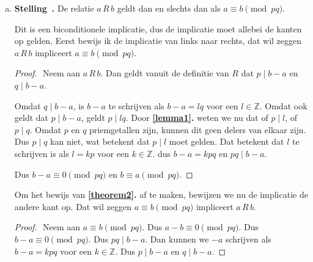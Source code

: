 \documentclass[12pt, dutch, a4paper]{article}
\theoremstyle{definition}
\newenvironment{shortthm}
  {\refstepcounter{theorem}\textbf{Stelling~\thetheorem.}}
{\enskip}
\begin{document}
\begin{enumerate}[(a).]
  \item 
  \begin{shortthm} \label{theorem2}
    De relatie $a\,R\,b$ geldt dan en slechts dan als $a \equiv b \pmod{pq}$.
  \end{shortthm}

  Dit is een biconditionele implicatie, dus de implicatie moet allebei de kanten op gelden.
  Eerst bewijs ik de implicatie van links naar rechts, 
  dat wil zeggen $a\,R\,b$ impliceert $a \equiv b \pmod{pq}$.

  \begin{proof} $ $ \newline
    Neem aan $a\,R\,b$. \newline
    Dan geldt vanuit de definitie van $R$ dat $p \mid b - a$ en $q \mid b - a$. 

    Omdat $q \mid b - a$, is $b - a$ te schrijven als $b - a = lq$ 
    voor een $l \in \mathbb{Z}$. \newline 
    Omdat ook geldt dat $p \mid b - a$, geldt $p \mid lq$. \newline
    Door \textbf{\cref{lemma1}.} weten we nu dat of $p \mid l$, of $p \mid q$. \newline
    Omdat $p$ en $q$ priemgetallen zijn, 
    kunnen dit geen delers van elkaar zijn. \newline
    Dus $p \mid q$ kan niet, wat betekent dat $p \mid l$ moet gelden. \newline
    Dat betekent dat $l$ te schrijven is als $l = kp$ voor een $k \in \mathbb{Z}$. \newline
    dus $b - a = kpq$ en $pq \mid b - a$. 

    Dus $b - a \equiv 0 \pmod{pq}$ en $b \equiv a \pmod{pq}$. \newline
  \end{proof}

  \newpage
  Om het bewijs van \textbf{\cref{theorem2}.} af te maken, 
  bewijzen we nu de implicatie de andere kant op. 
  Dat wil zeggen $a \equiv b \pmod{pq}$ impliceert $a\,R\,b$.
  
  \begin{proof} $ $ \newline
    Neem aan $a \equiv b \pmod{pq}$. \newline
    Dus $a - b \equiv 0 \pmod{pq}$. \newline
    Dus $b - a \equiv 0 \pmod{pq}$. \newline
    Dus $pq \mid b - a$. \newline  
    Dan kunnen we $  - a$ schrijven als $b - a = kpq$ voor een $k \in \mathbb{Z}$. \newline
    Dus $p \mid b - a$ en $q \mid b - a$. \newline
  \end{proof}


\end{enumerate}
\end{document}
